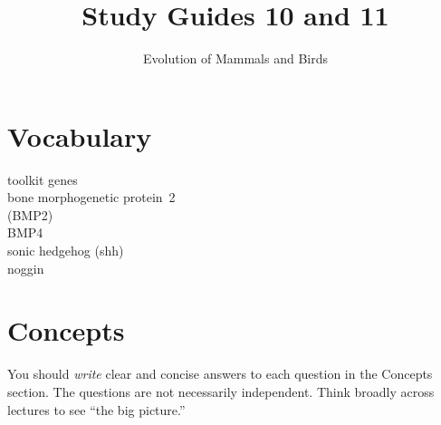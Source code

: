 \documentclass[letterpaper]{tufte-handout}
\title{Study Guides 10 and 11\hfill}
\author{Evolution of Mammals and Birds}
\date{} %
\begin{document}
\maketitle	%


\section{Vocabulary}
\vspace{-1\baselineskip}
\begin{multicols}{2}
toolkit genes\\
bone morphogenetic protein\ 2\\\hspace{1em}(BMP2)\\
BMP4\\
sonic hedgehog (shh)\\
noggin
\end{multicols}

\section{Concepts}

You should \emph{write} clear and concise answers to each question in the Concepts section.  The questions are not necessarily independent.  Think broadly across lectures to see ``the big picture.'' 
\end{document}
